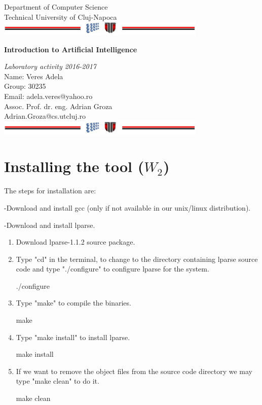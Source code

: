 \documentclass[a4paper,12pt]{report}
\begin{document}
\vspace{-5cm}
\begin{center}
Department of Computer Science\\
Technical University of Cluj-Napoca\\
\includegraphics[width=10cm]{fig/footer}
\end{center}
\vspace{1cm}
\begin{center}
\begin{Large}
 \textbf{Introduction to Artificial Intelligence}\\
\end{Large}
\textit{Laboratory activity 2016-2017}\\
\vspace{3cm}
Name: Veres Adela\\
Group: 30235\\
Email: adela.veres@yahoo.ro\\
\vspace{12cm}
Assoc. Prof. dr. eng. Adrian Groza\\
Adrian.Groza@cs.utcluj.ro\\
\vspace{1cm}
\includegraphics[width=10cm]{fig/footer}
\end{center}

\tableofcontents


\chapter{Installing the tool ($W_2$)}
\vspace{0.5cm}

The steps for installation are:

  -Download and install gcc (only if not available in our unix/linux distribution).
  
  -Download and install lparse.
\begin{enumerate}
 \item Download lparse-1.1.2 source package.
 \item Type "cd" in the terminal, to change to the directory containing lparse source code and type "./configure" to configure lparse for the system.

 ./configure
\item Type "make" to compile the binaries.

make
\item Type "make install" to install lparse.

make install
\item If we want to remove the object files from the source code directory we may type "make clean" to do it.

make clean
\end{enumerate}
\end{document}

